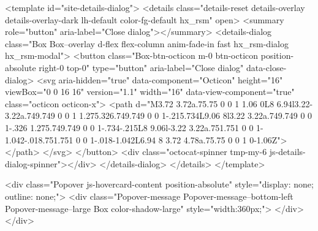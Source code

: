 {{{{{    <template id="site-details-dialog">
  <details class="details-reset details-overlay details-overlay-dark lh-default color-fg-default hx_rsm" open>
    <summary role="button" aria-label="Close dialog"></summary>
    <details-dialog class="Box Box--overlay d-flex flex-column anim-fade-in fast hx_rsm-dialog hx_rsm-modal">
      <button class="Box-btn-octicon m-0 btn-octicon position-absolute right-0 top-0" type="button" aria-label="Close dialog" data-close-dialog>
        <svg aria-hidden="true" data-component="Octicon" height="16" viewBox="0 0 16 16" version="1.1" width="16" data-view-component="true" class="octicon octicon-x">
    <path d="M3.72 3.72a.75.75 0 0 1 1.06 0L8 6.94l3.22-3.22a.749.749 0 0 1 1.275.326.749.749 0 0 1-.215.734L9.06 8l3.22 3.22a.749.749 0 0 1-.326 1.275.749.749 0 0 1-.734-.215L8 9.06l-3.22 3.22a.751.751 0 0 1-1.042-.018.751.751 0 0 1-.018-1.042L6.94 8 3.72 4.78a.75.75 0 0 1 0-1.06Z"></path>
</svg>
      </button>
      <div class="octocat-spinner tmp-my-6 js-details-dialog-spinner"></div>
    </details-dialog>
  </details>
</template>

    <div class="Popover js-hovercard-content position-absolute" style="display: none; outline: none;">
  <div class="Popover-message Popover-message--bottom-left Popover-message--large Box color-shadow-large" style="width:360px;">
  </div>
</div>

}}}}}
